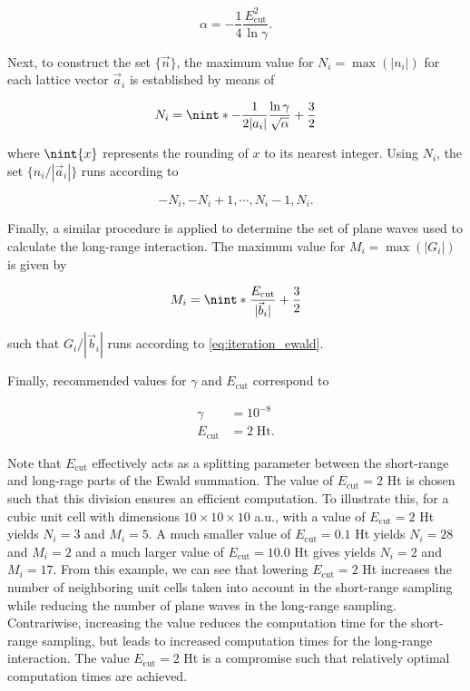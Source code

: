 \begin{equation}
    \alpha = -\frac{1}{4} \frac{E_{\text{cut}}^{2}}{\ln \gamma}.
    \label{eq:alpha_ewald}
\end{equation}

Next, to construct the set $\{\vec{n}\}$, the maximum value for $N_{i} = \max\left(|n_{i}|\right)$ for each lattice vector $\vec{a}_{i}$ is established by means of

\begin{equation}
    N_{i} = \nint*{-\frac{1}{2 |a_{i}|} \frac{\ln \gamma}{\sqrt{\alpha}} + \frac{3}{2}}
\end{equation}

where $\nint{x}$ represents the rounding of $x$ to its nearest integer. Using $N_{i}$, the set $\{n_{i} / |\vec{a}_{i}|\}$ runs according to

\begin{equation}
    -N_{i}, -N_{i} + 1, \cdots, N_{i}-1, N_{i}.
    \label{eq:iteration_ewald}
\end{equation}

Finally, a similar procedure is applied to determine the set of plane waves used to calculate the long-range interaction. The maximum value for $M_{i} = \max\left(|G_{i}|\right)$ is given by

\begin{equation}
    M_{i} = \nint*{\frac{E_{\text{cut}}}{|\vec{b}_{i}|} + \frac{3}{2}}
\end{equation}

such that $G_{i} / |\vec{b}_{i}|$ runs according to \cref{eq:iteration_ewald}.

Finally, recommended values for $\gamma$ and $E_{\text{cut}}$ correspond to

\begin{align}
    \gamma &= 10^{-8}\\
    E_{\text{cut}} &= 2 \; \text{Ht}.
\end{align}

Note that $E_{\text{cut}}$ effectively acts as a splitting parameter between the short-range and long-rage parts of the Ewald summation. The value of $E_{\text{cut}} = 2$ Ht is chosen such that this division ensures an efficient computation. To illustrate this, for a cubic unit cell with dimensions $10 \times 10 \times 10$ a.u., with a value of $E_{\text{cut}} = 2$ Ht yields $N_{i} = 3$ and $M_{i} = 5$. A much smaller value of $E_{\text{cut}} = 0.1$ Ht yields $N_{i} = 28$ and $M_{i} = 2$ and a much larger value of $E_{\text{cut}} = 10.0$ Ht gives yields $N_{i} = 2$ and $M_{i} = 17$. From this example, we can see that lowering $E_{\text{cut}} = 2$ Ht increases the number of neighboring unit cells taken into account in the short-range sampling while reducing the number of plane waves in the long-range sampling. Contrariwise, increasing the value reduces the computation time for the short-range sampling, but leads to increased computation times for the long-range interaction. The value $E_{\text{cut}} = 2$ Ht is a compromise such that relatively optimal computation times are achieved.